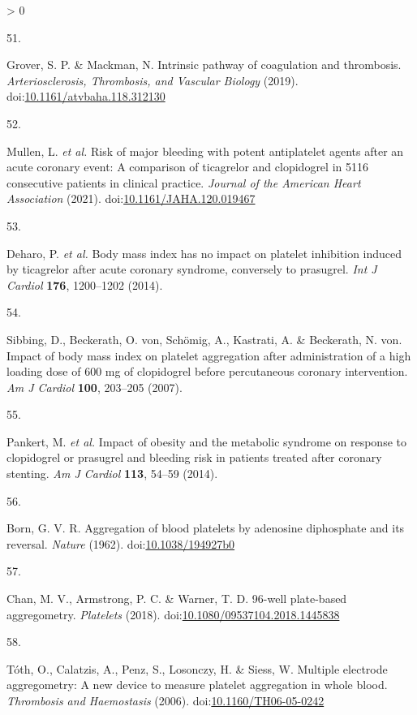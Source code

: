 \documentclass[11pt,twoside]{bristolthesis}
\newlength{\cslhangindent}
\newlength{\csllabelwidth}
\newenvironment{CSLReferences}[2] %
 {%
  \setlength{\parindent}{0pt}
  \ifodd #1 \everypar{\setlength{\hangindent}{\cslhangindent}}\ignorespaces\fi
  \ifnum #2 > 0
  \setlength{\parskip}{#2\baselineskip}
  \fi
 }%
 {}
\newcommand{\CSLLeftMargin}[1]{\parbox[t]{\csllabelwidth}{#1}}
\newcommand{\CSLRightInline}[1]{\parbox[t]{\linewidth - \csllabelwidth}{#1}\break}
\begin{document}
\begin{CSLReferences}{0}{0}
\leavevmode\hypertarget{ref-Grover2019}{}%
\CSLLeftMargin{51. }
\CSLRightInline{Grover, S. P. \& Mackman, N. Intrinsic pathway of coagulation and thrombosis. \emph{Arteriosclerosis, Thrombosis, and Vascular Biology} (2019). doi:\href{https://doi.org/10.1161/atvbaha.118.312130}{10.1161/atvbaha.118.312130}}

\leavevmode\hypertarget{ref-Mullen2021}{}%
\CSLLeftMargin{52. }
\CSLRightInline{Mullen, L. \emph{et al.} Risk of major bleeding with potent antiplatelet agents after an acute coronary event: A comparison of ticagrelor and clopidogrel in 5116 consecutive patients in clinical practice. \emph{Journal of the American Heart Association} (2021). doi:\href{https://doi.org/10.1161/JAHA.120.019467}{10.1161/JAHA.120.019467}}

\leavevmode\hypertarget{ref-Deharo2014}{}%
\CSLLeftMargin{53. }
\CSLRightInline{Deharo, P. \emph{et al.} Body mass index has no impact on platelet inhibition induced by ticagrelor after acute coronary syndrome, conversely to prasugrel. \emph{Int J Cardiol} \textbf{176}, 1200--1202 (2014).}

\leavevmode\hypertarget{ref-Sibbing2007}{}%
\CSLLeftMargin{54. }
\CSLRightInline{Sibbing, D., Beckerath, O. von, Schömig, A., Kastrati, A. \& Beckerath, N. von. Impact of body mass index on platelet aggregation after administration of a high loading dose of 600 mg of clopidogrel before percutaneous coronary intervention. \emph{Am J Cardiol} \textbf{100}, 203--205 (2007).}

\leavevmode\hypertarget{ref-Pankert2014}{}%
\CSLLeftMargin{55. }
\CSLRightInline{Pankert, M. \emph{et al.} Impact of obesity and the metabolic syndrome on response to clopidogrel or prasugrel and bleeding risk in patients treated after coronary stenting. \emph{Am J Cardiol} \textbf{113}, 54--59 (2014).}

\leavevmode\hypertarget{ref-Born1962}{}%
\CSLLeftMargin{56. }
\CSLRightInline{Born, G. V. R. Aggregation of blood platelets by adenosine diphosphate and its reversal. \emph{Nature} (1962). doi:\href{https://doi.org/10.1038/194927b0}{10.1038/194927b0}}

\leavevmode\hypertarget{ref-Chan2018}{}%
\CSLLeftMargin{57. }
\CSLRightInline{Chan, M. V., Armstrong, P. C. \& Warner, T. D. 96-well plate-based aggregometry. \emph{Platelets} (2018). doi:\href{https://doi.org/10.1080/09537104.2018.1445838}{10.1080/09537104.2018.1445838}}

\leavevmode\hypertarget{ref-Toth2006}{}%
\CSLLeftMargin{58. }
\CSLRightInline{Tóth, O., Calatzis, A., Penz, S., Losonczy, H. \& Siess, W. Multiple electrode aggregometry: A new device to measure platelet aggregation in whole blood. \emph{Thrombosis and Haemostasis} (2006). doi:\href{https://doi.org/10.1160/TH06-05-0242}{10.1160/TH06-05-0242}}


\end{CSLReferences}
\end{document}
